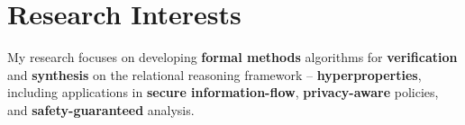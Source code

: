 

\section{Research Interests}

My research focuses on developing {\bf formal methods} algorithms for 
{\bf verification} and {\bf synthesis} on
the relational reasoning framework -- {\bf hyperproperties}, 
including applications in
{\bf secure information-flow}, 
{\bf privacy-aware} policies, 
and {\bf safety-guaranteed} analysis.\\

